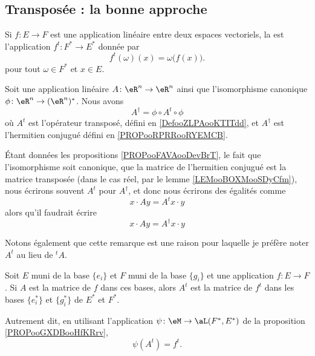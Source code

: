 \subsection{Transposée : la bonne approche}

\begin{definition}      \label{DefooZLPAooKTITdd}
	Si \( f\colon E\to F\) est une application linéaire entre deux espaces vectoriels, la  est l'application \( f^t\colon F^*\to E^*\) donnée par
	\begin{equation}
		f^t(\omega)(x)=\omega\big( f(x) \big).
	\end{equation}
	pour tout \( \omega\in F^*\) et \( x\in E\).
\end{definition}


\begin{proposition}		\label{PROPooFAVAooDevBrT}
	Soit une application linéaire \(A \colon \eR^n\to \eR^n  \) ainsi que l'isomorphisme canonique \(\phi \colon \eR^n\to (\eR^n)^*  \). Nous avons
	\begin{equation}
		A^{\dag}=\phi\circ A^t\circ \phi
	\end{equation}
	où \( A^t\) est l'opérateur transposé, défini en \ref{DefooZLPAooKTITdd}, et \( A^{\dag}\) est l'hermitien conjugué défini en \ref{PROPooRPRRooRYEMCB}.
\end{proposition}

\begin{normaltext}		\label{NORMooFUZYooWeXjp}
	Étant données les propositions \ref{PROPooFAVAooDevBrT}, le fait que l'isomorphisme soit canonique, que la matrice de l'hermitien conjugué est la matrice transposée (dans le cas réel, par le lemme \ref{LEMooBOXMooSDyCfm}), nous écrirons souvent \( A^t\) pour \( A^{\dag}\), et donc nous écrirons des égalités comme
	\begin{equation}
		x\cdot Ay=A^tx\cdot y
	\end{equation}
	alors qu'il faudrait écrire
	\begin{equation}
		x\cdot Ay=A^{\dag}x\cdot y
	\end{equation}

	Notons également que cette remarque est une raison pour laquelle je préfère noter \( A^t\) au lieu de \( {}^tA\).
\end{normaltext}

\begin{lemma}       \label{LEMooEMNNooPquZMg}
	Soit \( E\) muni de la base \( \{ e_i \}\) et \( F\) muni de la base \( \{ g_i \}\) et une application \( f\colon E\to F\). Si \( A\) est la matrice de \( f\) dans ces bases, alors \( A^t\) est la matrice de \( f^t\) dans les bases \( \{ e^*_i \}\) et \( \{ g^*_i \}\) de \( E^*\) et \( F^*\).

	Autrement dit, en utilisant l'application \( \psi\colon \eM\to \aL(F^*,E^*)\) de la proposition \ref{PROPooGXDBooHfKRrv},
	\begin{equation}
		\psi(A^t)=f^t.
	\end{equation}
\end{lemma}

